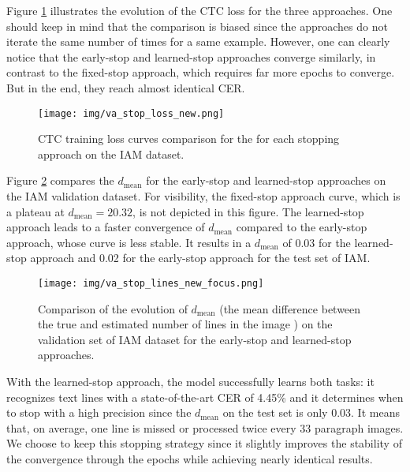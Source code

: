 Figure \ref{fig:loss-stop} illustrates the evolution of the CTC loss for the three approaches. One should keep in mind that the comparison is biased since the approaches do not iterate the same number of times for a same example. However, one can clearly notice that the early-stop and learned-stop approaches  converge similarly, in contrast to the fixed-stop approach, which requires far more epochs to converge. But in the end, they reach almost identical CER.

\begin{figure}[htbp!]
\centering
\texttt{[image: img/va\_stop\_loss\_new.png]}
        \caption{CTC training loss curves comparison for the \modelacc{} for each stopping approach on the IAM dataset.}
        \label{fig:loss-stop}

\end{figure}


Figure \ref{fig:diff-stop} compares the $d_\mathrm{mean}$ for the early-stop and learned-stop approaches on the IAM validation dataset. For visibility, the fixed-stop approach curve, which is a plateau at $d_\mathrm{mean}=20.32$, is not depicted in this figure. The learned-stop approach leads to a faster convergence of $d_\mathrm{mean}$ compared to the early-stop approach, whose curve is less stable. It results in a $d_\mathrm{mean}$ of 0.03 for the learned-stop approach and 0.02 for the early-stop approach for the test set of IAM.

\begin{figure}[htbp!]
\centering
\texttt{[image: img/va\_stop\_lines\_new\_focus.png]}
        \caption{Comparison of the evolution of $d_\mathrm{mean}$ (the mean difference between the true and estimated number of lines in the image ) on the validation set of IAM dataset for the early-stop and learned-stop approaches.}
        \label{fig:diff-stop}
\end{figure}

With the learned-stop approach, the model successfully learns both tasks: it recognizes text lines with a state-of-the-art CER of 4.45\% and it determines when to stop with a high precision since the $d_\mathrm{mean}$ on the test set is only 0.03. It means that, on average, one line is missed or processed twice every 33 paragraph images.
We choose to keep this stopping strategy since it slightly improves the stability of the convergence through the epochs while achieving nearly identical results.


